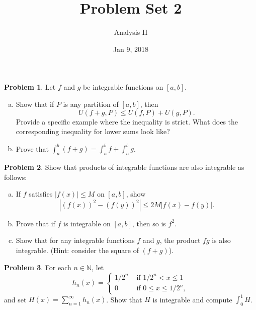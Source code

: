 \documentclass{amsart}
\newcommand{\+}[1]{\ensuremath{\mathbf{#1}}}
\theoremstyle{definition}
\newtheorem{prob}{Problem}
\begin{document}
\title{Problem Set 2}
\date{Jan 9, 2018}
\author{Analysis II}

\maketitle

\begin{prob}
Let $f$ and $g$ be integrable functions on $[a,b]$.
\begin{enumerate}[(a)]
 \item Show that if $P$ is any partition of $[a,b]$, then
 \[
 U(f+g,P) \leq U(f,P) + U(g,P).
 \]
 Provide a specific example where the inequality is strict.
 What does the corresponding inequality for lower sums
 look like?
 \item Prove that $\int_a^b (f + g) = \int_a^b f + \int_a^b g$.
\end{enumerate}
\end{prob}

\vspace{3mm}

\begin{prob}
Show that products of integrable functions are
also integrable as follows:
\begin{enumerate}[(a)]
 \item If $f$ satisfies $|f(x)| \leq M$ on $[a,b]$, show
 \[
 |(f(x))^2 - (f(y))^2| \leq 2M|f(x) - f(y)|.
 \]
\item Prove that if $f$ is integrable on $[a,b]$, then
so is $f^2$.
\item Show that for any integrable functions $f$ and $g$, the
product $fg$ is also integrable. (Hint: consider the square
of $(f+g)$).
 \end{enumerate}
\end{prob}

\vspace{3mm}


\begin{prob}
 For each $n \in \mathbb{N}$, let
 \[
 h_n(x)= \begin{cases}
          1/2^n &\text{ if } 1/2^n < x \leq 1 \\
          0 &\text{ if } 0 \leq x \leq 1/2^n,
         \end{cases}
 \]
 and set $H(x) = \sum^\infty_{n=1} h_n(x)$.  Show that
 $H$ is integrable and compute $\int_0^1 H$.
\end{prob}

\vspace{3mm}
\end{document}
